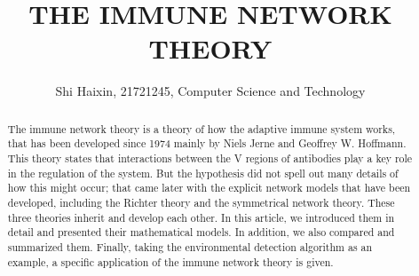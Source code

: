 \documentclass[Proceedings]{ascelike}
\begin{document}
\title{THE IMMUNE NETWORK THEORY}
\author{
Shi Haixin, 21721245, Computer Science and Technology
}
\maketitle

\begin{abstract}
The immune network theory is a theory of how the adaptive immune system works, that has been developed since 1974 mainly by Niels Jerne and Geoffrey W. Hoffmann. This theory states that interactions between the V regions of antibodies play a key role in the regulation of the system. But the hypothesis did not spell out many details of how this might occur; that came later with the explicit network models that have been developed, including the Richter theory and the symmetrical network theory. These three theories inherit and develop each other. In this article, we introduced them in detail and presented their mathematical models. In addition, we also compared and summarized them. Finally, taking the environmental detection algorithm as an example, a specific application of the immune network theory is given.
\end{abstract}

\end{document}
